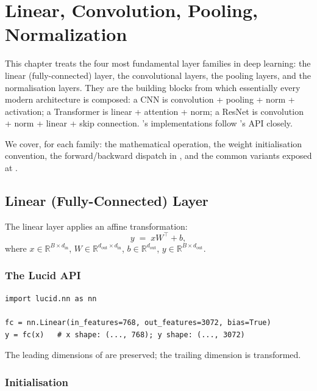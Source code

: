 \chapter{Linear, Convolution, Pooling, Normalization}
\label{ch:linear_conv_norm}

This chapter treats the four most fundamental layer families in
deep learning: the linear (fully-connected) layer, the
convolutional layers, the pooling layers, and the normalisation
layers. They are the building blocks from which essentially every
modern architecture is composed: a CNN is convolution + pooling +
norm + activation; a Transformer is linear + attention + norm; a
ResNet is convolution + norm + linear + skip connection. \Lucid's
implementations follow 's API closely.

We cover, for each family: the mathematical operation, the
weight initialisation convention, the forward/backward dispatch
in \Lucid, and the common variants exposed at .

\section{Linear (Fully-Connected) Layer}
\label{sec:linear_conv_norm:linear}

The linear layer applies an affine transformation:
\[
y \;=\; x W^\top + b,
\]
where $x \in \mathbb{R}^{B \times d_{\text{in}}}$, $W \in
\mathbb{R}^{d_{\text{out}} \times d_{\text{in}}}$, $b \in
\mathbb{R}^{d_{\text{out}}}$, $y \in \mathbb{R}^{B \times
d_{\text{out}}}$.

\subsection{The Lucid API}
\label{ssec:linear_conv_norm:linear_api}

\begin{lstlisting}[style=lucid,language=LucidPython]
import lucid.nn as nn

fc = nn.Linear(in_features=768, out_features=3072, bias=True)
y = fc(x)   # x shape: (..., 768); y shape: (..., 3072)
\end{lstlisting}

The leading dimensions of  are preserved; the trailing
dimension is transformed.

\subsection{Initialisation}
\label{ssec:linear_conv_norm:linear_init}

